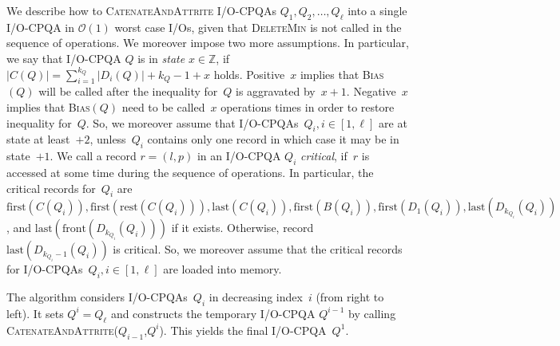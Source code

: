 \documentclass[]{article}
\newcommand{\front}{\text{front}}
\newcommand{\first}{\text{first}}
\newcommand{\last}{\text{last}}
\newcommand{\rest}{\text{rest}}
\newcommand{\bigO}{\mathcal{O}}
\begin{document}
We describe how to \textsc{CatenateAndAttrite} I/O-CPQAs
$Q_{1},Q_2,\ldots,Q_{\ell}$ into a single I/O-CPQA in $\bigO(1)$ worst case
I/Os, given that \textsc{DeleteMin} is not called in the sequence of operations.
We moreover impose two more assumptions. In particular, we say that I/O-CPQA $Q$
is in \textit{state} $x \in \mathbb{Z}$, if $|C(Q)| = \sum_{i=1}^{k_Q}{|D_i(Q)|}
+ k_Q -1 +x$ holds.  Positive~$x$ implies that \textsc{Bias}$(Q)$ will be called
after the inequality for~$Q$ is aggravated by~$x+1$. Negative~$x$ implies that
\textsc{Bias}$(Q)$ need to be called~$x$ operations times in order to restore
inequality for~$Q$.  So, we moreover assume that I/O-CPQAs~$Q_{i},i \in[1,\ell]$
are at state at least~$+2$, unless~$Q_{i}$ contains only one record in which
case it may be in state~$+1$.  We call a record $r=(l,p)$ in an I/O-CPQA $Q_i$
\textit{critical}, if~$r$ is accessed at some time during the sequence of
operations.  In particular, the critical records for~$Q_i$ are
$\first(C(Q_i)),\first(\rest(C(Q_i))),\last(C(Q_i)),\first(B(Q_i)),\first(D_1(Q_i)),\last(D_{k_{Q_i}}(Q_i))$,
and $\last(\front(D_{k_{Q_i}}(Q_i)))$ if it exists. Otherwise, record
$\last(D_{k_{Q_i}-1}(Q_i))$ is critical.  So, we moreover assume that the
critical records for I/O-CPQAs~$Q_{i},i\in[1,\ell]$ are loaded into memory.

The algorithm considers I/O-CPQAs~$Q_{i}$ in decreasing index~$i$ (from right to
left). It sets $Q^{i}=Q_\ell$ and constructs the temporary I/O-CPQA $Q^{i-1}$ by
calling \textsc{CatenateAndAttrite}($Q_{i-1}$,$Q^{i}$).  This yields the final
I/O-CPQA~$Q^{1}$.
\end{document}
